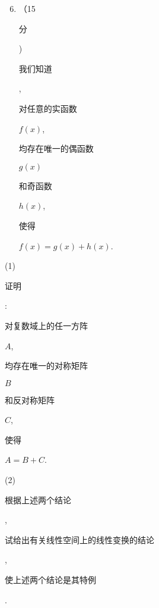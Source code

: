 \documentclass[10pt]{article}
\begin{document}
\begin{enumerate}
  \setcounter{enumi}{5}
  \item （15 \begin{CJK}{UTF8}{mj}分\end{CJK}) \begin{CJK}{UTF8}{mj}我们知道\end{CJK}, \begin{CJK}{UTF8}{mj}对任意的实函数\end{CJK} $f(x)$, \begin{CJK}{UTF8}{mj}均存在唯一的偶函数\end{CJK} $g(x)$ \begin{CJK}{UTF8}{mj}和奇函数\end{CJK} $h(x)$, \begin{CJK}{UTF8}{mj}使得\end{CJK} $f(x)=g(x)+h(x)$.
\end{enumerate}
(1) \begin{CJK}{UTF8}{mj}证明\end{CJK}: \begin{CJK}{UTF8}{mj}对复数域上的任一方阵\end{CJK} $A$, \begin{CJK}{UTF8}{mj}均存在唯一的对称矩阵\end{CJK} $B$ \begin{CJK}{UTF8}{mj}和反对称矩阵\end{CJK} $C$, \begin{CJK}{UTF8}{mj}使得\end{CJK} $A=B+C$.

(2) \begin{CJK}{UTF8}{mj}根据上述两个结论\end{CJK}, \begin{CJK}{UTF8}{mj}试给出有关线性空间上的线性变换的结论\end{CJK}, \begin{CJK}{UTF8}{mj}使上述两个结论是其特例\end{CJK}.
\end{document}
